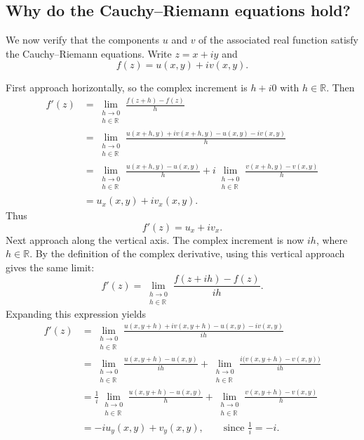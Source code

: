 \documentclass[11pt]{article}
\newcommand{\R}{\mathbb R}
\begin{document}
\subsection{Why do the Cauchy--Riemann equations hold?}
We now verify that the components $u$ and $v$ of the associated real
function satisfy the Cauchy--Riemann equations. Write $z=x+iy$ and
\[
 f(z)=u(x,y)+iv(x,y).
\]
\begin{center}
\end{center}
First approach horizontally, so the complex increment is $h+i0$ with
$h\in\R$. Then
\begin{align*}
 f'(z)
 &=\lim_{\substack{h\to0\\h\in\R}}\frac{f(z+h)-f(z)}{h}\\
 &=\lim_{\substack{h\to0\\h\in\R}}
 \frac{u(x+h,y)+iv(x+h,y)-u(x,y)-iv(x,y)}{h}\\
 &=\lim_{\substack{h\to0\\h\in\R}}
 \frac{u(x+h,y)-u(x,y)}{h}
 +i\lim_{\substack{h\to0\\h\in\R}}
 \frac{v(x+h,y)-v(x,y)}{h}\\
 &=u_x(x,y)+iv_x(x,y).
\end{align*}
Thus
\[
 \boxed{f'(z)=u_x+iv_x.}
\]
Next approach along the vertical axis. The complex increment is now $ih$,
where $h\in\R$. By the definition of the complex derivative, using this
vertical approach gives the same limit:
\[
 f'(z)=\lim_{\substack{h\to0\\h\in\R}}
 \frac{f(z+ih)-f(z)}{ih}.
\]
Expanding this expression yields
\begin{align*}
 f'(z)
 &=\lim_{\substack{h\to0\\h\in\R}}
 \frac{u(x,y+h)+iv(x,y+h)-u(x,y)-iv(x,y)}{ih}\\
 &=\lim_{\substack{h\to0\\h\in\R}}
 \frac{u(x,y+h)-u(x,y)}{ih}
 +\lim_{\substack{h\to0\\h\in\R}}
 \frac{i\bigl(v(x,y+h)-v(x,y)\bigr)}{ih}\\
 &=\frac1i\lim_{\substack{h\to0\\h\in\R}}
 \frac{u(x,y+h)-u(x,y)}{h}
 +\lim_{\substack{h\to0\\h\in\R}}
 \frac{v(x,y+h)-v(x,y)}{h}\\
 &=-iu_y(x,y)+v_y(x,y),\qquad\text{since }\frac1i=-i.
\end{align*}
\end{document}
